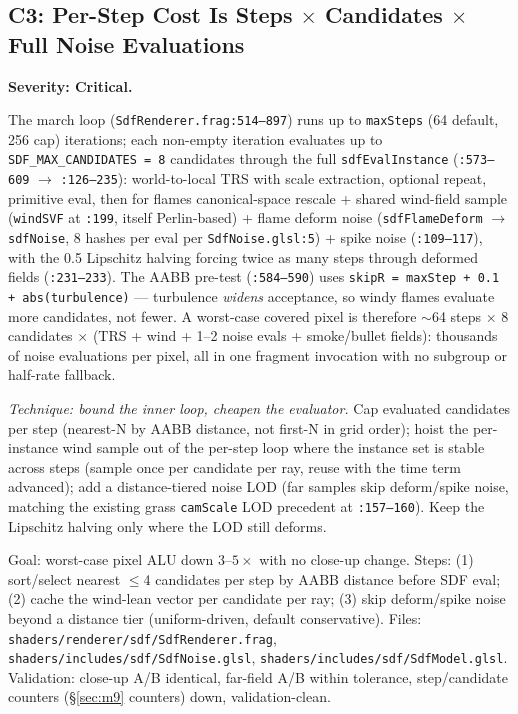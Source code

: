 \documentclass[11pt,a4paper]{article}
\begin{document}
\subsection{C3: Per-Step Cost Is Steps $\times$ Candidates $\times$ Full Noise Evaluations}
\label{sec:c3}

\textbf{Severity: Critical.}

The march loop (\texttt{SdfRenderer.frag:514--897}) runs up to
\texttt{maxSteps} (64 default, 256 cap) iterations; each non-empty iteration
evaluates up to \texttt{SDF\_MAX\_CANDIDATES = 8} candidates through the full
\texttt{sdfEvalInstance} (\texttt{:573--609} $\rightarrow$ \texttt{:126--235}):
world-to-local TRS with scale extraction, optional repeat, primitive eval,
then for flames canonical-space rescale + shared wind-field sample
(\texttt{windSVF} at \texttt{:199}, itself Perlin-based) + flame deform noise
(\texttt{sdfFlameDeform} $\rightarrow$ \texttt{sdfNoise}, 8 hashes per eval
per \texttt{SdfNoise.glsl:5}) + spike noise (\texttt{:109--117}), with the
0.5 Lipschitz halving forcing twice as many steps through deformed fields
(\texttt{:231--233}). The AABB pre-test (\texttt{:584--590}) uses
\texttt{skipR = maxStep + 0.1 + abs(turbulence)} --- turbulence \emph{widens}
acceptance, so windy flames evaluate more candidates, not fewer. A worst-case
covered pixel is therefore $\sim$64 steps $\times$ 8 candidates $\times$
(TRS + wind + 1--2 noise evals + smoke/bullet fields): thousands of noise
evaluations per pixel, all in one fragment invocation with no subgroup or
half-rate fallback.

\textit{Technique: bound the inner loop, cheapen the evaluator.} Cap
evaluated candidates per step (nearest-N by AABB distance, not first-N in grid
order); hoist the per-instance wind sample out of the per-step loop where the
instance set is stable across steps (sample once per candidate per ray, reuse
with the time term advanced); add a distance-tiered noise LOD (far samples
skip deform/spike noise, matching the existing grass \texttt{camScale} LOD
precedent at \texttt{:157--160}). Keep the Lipschitz halving only where the
LOD still deforms.

\begin{tcolorbox}[promptbox={Prompt --- C3: bounded candidates, LOD'd noise}]
Goal: worst-case pixel ALU down $3$--$5\times$ with no close-up change.
Steps: (1) sort/select nearest $\le$4 candidates per step by AABB distance
before SDF eval; (2) cache the wind-lean vector per candidate per ray;
(3) skip deform/spike noise beyond a distance tier (uniform-driven, default
conservative). Files: \texttt{shaders/renderer/sdf/SdfRenderer.frag},
\texttt{shaders/includes/sdf/SdfNoise.glsl},
\texttt{shaders/includes/sdf/SdfModel.glsl}. Validation: close-up A/B
identical, far-field A/B within tolerance, step/candidate counters
(\S\ref{sec:m9} counters) down, validation-clean.
\end{tcolorbox}
\end{document}
